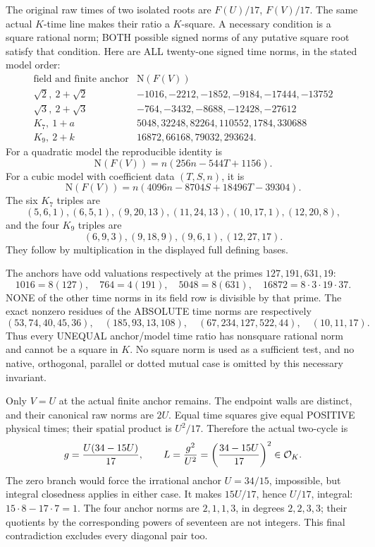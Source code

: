 \documentclass[11pt]{article}
\begin{document}
The original raw times of two isolated roots are \(F(U)/17\),
\(F(V)/17\).
The same actual \(K\)-time line makes their ratio a \(K\)-square.
A necessary condition is a square rational norm; BOTH possible
signed norms of any putative square root satisfy that condition.
Here are ALL twenty-one signed time norms, in the stated model order:
\[
\begin{array}{c|l}
\text{field and finite anchor}&\mathrm N(F(V))\\ \hline
\sqrt2,\ 2+\sqrt2&
 -1016,-2212,-1852,-9184,-17444,-13752\\
\sqrt3,\ 2+\sqrt3&
 -764,-3432,-8688,-12428,-27612\\
K_7,\ 1+a&
 5048,32248,82264,110552,1784,330688\\
K_9,\ 2+k&
 16872,66168,79032,293624 .
\end{array}
\]
For a quadratic model the reproducible identity is
\[
 \mathrm N(F(V))=n(256n-544T+1156).
\]
For a cubic model with coefficient data \((T,S,n)\), it is
\[
 \mathrm N(F(V))
      =n(4096n-8704S+18496T-39304).
\]
The six \(K_7\) triples are
\[
 (5,6,1),(6,5,1),(9,20,13),(11,24,13),(10,17,1),(12,20,8),
\]
and the four \(K_9\) triples are
\[
                     (6,9,3),(9,18,9),(9,6,1),(12,27,17).
\]
They follow by multiplication in the displayed full defining bases.

The anchors have odd valuations respectively at the primes
\(127,191,631,19\):
\[
 1016=8(127),\quad764=4(191),\quad5048=8(631),\quad
 16872=8\cdot3\cdot19\cdot37.
\]
NONE of the other time norms in its field row is divisible by
that prime.  The exact nonzero residues of the ABSOLUTE time norms
are respectively
\[
 (53,74,40,45,36),\quad(185,93,13,108),\quad
 (67,234,127,522,44),\quad(10,11,17).
\]
Thus every UNEQUAL anchor/model time ratio has nonsquare rational
norm and cannot be a square in \(K\).
No square norm is used as a sufficient test, and no native,
orthogonal, parallel or dotted mutual case is omitted by this
necessary invariant.

Only \(V=U\) at the actual finite anchor remains.
The endpoint walls are distinct, and their canonical raw norms
are \(2U\).
Equal time squares give equal POSITIVE physical times;
their spatial product is \(U^2/17\).
Therefore the actual two-cycle is
\[
 g={U(34-15U)\over17},\qquad
 L={g^2\over U^2}=\left({34-15U\over17}\right)^2
                     \in\mathcal O_K .
\]
The zero branch would force the irrational anchor \(U=34/15\),
impossible, but integral closedness applies in either case.
It makes \(15U/17\), hence \(U/17\), integral:
\(15\cdot8-17\cdot7=1\).
The four anchor norms are \(2,1,1,3\), in degrees \(2,2,3,3\);
their quotients by the corresponding powers of seventeen
are not integers.
This final contradiction excludes every diagonal pair too.
\end{document}
